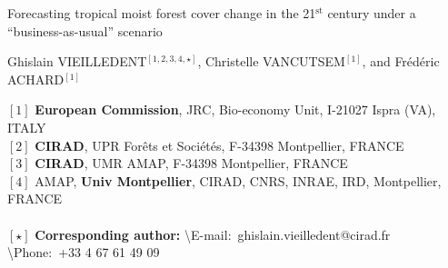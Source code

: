 \renewcommand{\bibsection}{}  %

\begin{center}
  \LARGE{Forecasting tropical moist forest cover change in the 21$^{\text{st}}$ century under a ``business-as-usual'' scenario}
\end{center}

\vspace{1cm}

\begin{center}
  \large{Ghislain VIEILLEDENT$^{[1, 2, 3, 4, \star]}$, Christelle VANCUTSEM$^{[1]}$, and Frédéric ACHARD$^{[1]}$}
\end{center}

\vspace{1cm}

{\small
  \begin{flushleft}  
    $[1]$ \textbf{European Commission}, JRC, Bio-economy Unit, I-21027 Ispra (VA), ITALY\\
    $[2]$ \textbf{CIRAD}, UPR Forêts et Sociétés, F-34398 Montpellier, FRANCE\\
    $[3]$ \textbf{CIRAD}, UMR AMAP, F-34398 Montpellier, FRANCE\\
    $[4]$ AMAP, \textbf{Univ Montpellier}, CIRAD, CNRS, INRAE, IRD, Montpellier, FRANCE\\
    ~\\
    $[\star]$ \textbf{Corresponding author:}
    \textbackslash{E-mail}:~ghislain.vieilledent@cirad.fr
    \textbackslash{Phone}:~+33 4 67 61 49 09\\
  \end{flushleft}}

\newpage
